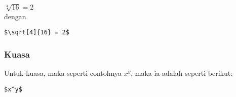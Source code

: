 $\sqrt[4]{16} = 2$\\

dengan\\

\begin{Verbatim}[frame=single]
 $\sqrt[4]{16} = 2$
\end{Verbatim}


\subsubsection{Kuasa}
Untuk kuasa, maka seperti contohnya $x^y$, maka ia adalah seperti berikut:\\

\begin{Verbatim}[frame=single]
 $x^y$
\end{Verbatim}



% 

